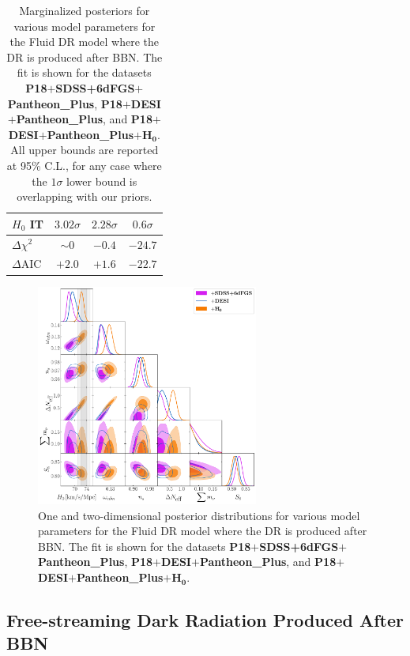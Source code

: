 \documentclass[aps,prd,twocolumn,notitlepage,
superscriptaddress,
nofootinbib,floatfix]{revtex4-2}
\newcommand{\planck}{\textbf{P18}}
\newcommand{\desi}{$\mathbf{+}$\textbf{DESI}}
\newcommand{\boss}{$\mathbf{+}$\textbf{SDSS+6dFGS}}
\newcommand{\pantheon}{$\mathbf{+}${\bf Pantheon\_Plus}}
\newcommand{\shoes}{$\mathbf{+ H_0}$}
\begin{document}
\begin{widetext}
\begin{table}[H]
\begin{tabular} {| l | c| c| c|}
\hline
$H_0$ IT & $3.02\sigma $ & $2.28\sigma $ & $0.6\sigma $\\
\hline
$\Delta \chi^2$ & $\sim 0$ & $-0.4$ & $-24.7$\\
\hline
$\Delta$AIC & $+2.0$ & $+1.6$ & $-22.7$\\
\hline
\end{tabular}
\caption{Marginalized posteriors for various model parameters for the Fluid DR model where the DR is produced after BBN. The fit is shown for the datasets \planck\boss\pantheon, \planck\desi\pantheon, and \planck\desi\pantheon\shoes. All upper bounds are reported at 95\% C.L., for any case where the $1\sigma$ lower bound is overlapping with our priors.}
\end{table}


\begin{figure}[H]
\centering
    \includegraphics[width=0.65\textwidth]{figures_21_4/all_sidrnb.pdf}
    \caption{One and two-dimensional posterior distributions for various model parameters for the Fluid DR model where the DR is produced after BBN. The fit is shown for the datasets \planck\boss\pantheon, \planck\desi\pantheon, and \planck\desi\pantheon\shoes.}
\end{figure}

\subsection{Free-streaming Dark Radiation Produced After BBN}\label{app:FS_afterbbn}



\end{widetext}
\end{document}
